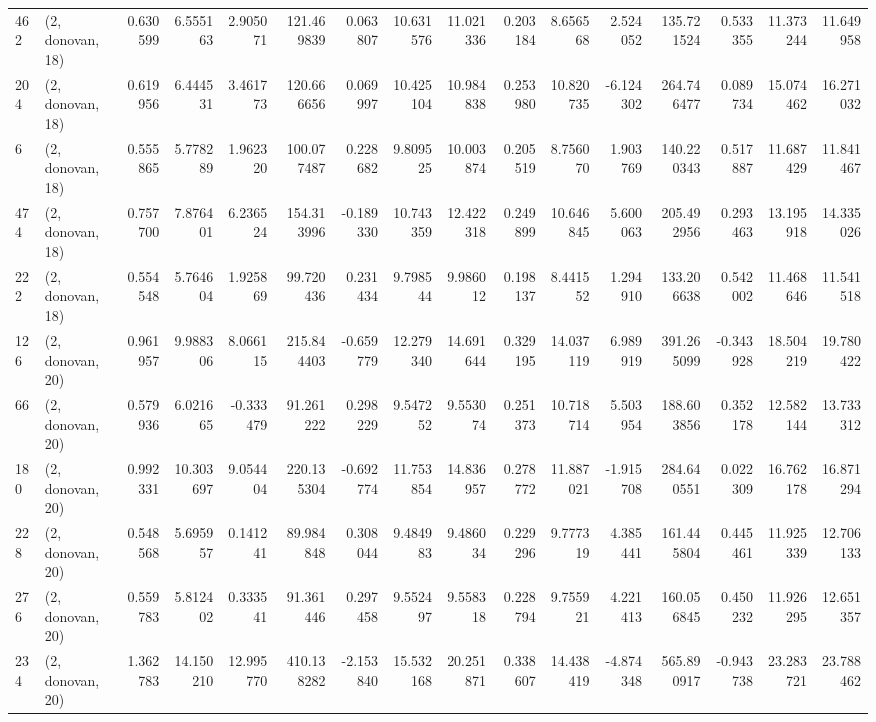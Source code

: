 \begin{tabular}{llrrrrrrrrrrrrrr}
462 &  (2, donovan, 18) &   0.630599 &   6.555163 &   2.905071 &   121.469839 &   0.063807 &  10.631576 &  11.021336 &  0.203184 &   8.656568 &   2.524052 &   135.721524 &   0.533355 &  11.373244 &  11.649958 \\
204 &  (2, donovan, 18) &   0.619956 &   6.444531 &   3.461773 &   120.666656 &   0.069997 &  10.425104 &  10.984838 &  0.253980 &  10.820735 &  -6.124302 &   264.746477 &   0.089734 &  15.074462 &  16.271032 \\
6   &  (2, donovan, 18) &   0.555865 &   5.778289 &   1.962320 &   100.077487 &   0.228682 &   9.809525 &  10.003874 &  0.205519 &   8.756070 &   1.903769 &   140.220343 &   0.517887 &  11.687429 &  11.841467 \\
474 &  (2, donovan, 18) &   0.757700 &   7.876401 &   6.236524 &   154.313996 &  -0.189330 &  10.743359 &  12.422318 &  0.249899 &  10.646845 &   5.600063 &   205.492956 &   0.293463 &  13.195918 &  14.335026 \\
222 &  (2, donovan, 18) &   0.554548 &   5.764604 &   1.925869 &    99.720436 &   0.231434 &   9.798544 &   9.986012 &  0.198137 &   8.441552 &   1.294910 &   133.206638 &   0.542002 &  11.468646 &  11.541518 \\
126 &  (2, donovan, 20) &   0.961957 &   9.988306 &   8.066115 &   215.844403 &  -0.659779 &  12.279340 &  14.691644 &  0.329195 &  14.037119 &   6.989919 &   391.265099 &  -0.343928 &  18.504219 &  19.780422 \\
66  &  (2, donovan, 20) &   0.579936 &   6.021665 &  -0.333479 &    91.261222 &   0.298229 &   9.547252 &   9.553074 &  0.251373 &  10.718714 &   5.503954 &   188.603856 &   0.352178 &  12.582144 &  13.733312 \\
180 &  (2, donovan, 20) &   0.992331 &  10.303697 &   9.054404 &   220.135304 &  -0.692774 &  11.753854 &  14.836957 &  0.278772 &  11.887021 &  -1.915708 &   284.640551 &   0.022309 &  16.762178 &  16.871294 \\
228 &  (2, donovan, 20) &   0.548568 &   5.695957 &   0.141241 &    89.984848 &   0.308044 &   9.484983 &   9.486034 &  0.229296 &   9.777319 &   4.385441 &   161.445804 &   0.445461 &  11.925339 &  12.706133 \\
276 &  (2, donovan, 20) &   0.559783 &   5.812402 &   0.333541 &    91.361446 &   0.297458 &   9.552497 &   9.558318 &  0.228794 &   9.755921 &   4.221413 &   160.056845 &   0.450232 &  11.926295 &  12.651357 \\
234 &  (2, donovan, 20) &   1.362783 &  14.150210 &  12.995770 &   410.138282 &  -2.153840 &  15.532168 &  20.251871 &  0.338607 &  14.438419 &  -4.874348 &   565.890917 &  -0.943738 &  23.283721 &  23.788462 \\

\end{tabular}
